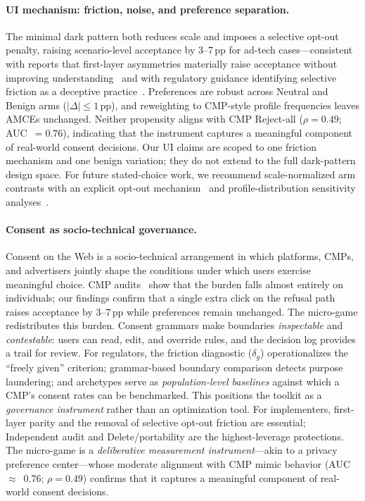 \documentclass{eusset}
\begin{document}
\paragraph{UI mechanism: friction, noise, and preference separation.}
The minimal dark pattern both reduces scale and imposes a selective opt-out penalty, raising scenario-level acceptance by 3--7\,pp for ad-tech cases---consistent with reports that first-layer asymmetries materially raise acceptance without improving understanding~\citep{Nouwens2020CHI,Habib2022CHI,Bielova2024USENIX,Berens2024CoSe} and with regulatory guidance identifying selective friction as a deceptive practice~\citep{EDPB2023DarkPatterns,ICO_CMA_2023_HarmfulDesign}. Preferences are robust across Neutral and Benign arms ($|\Delta| \le 1$\,pp), and reweighting to CMP-style profile frequencies leaves AMCEs unchanged. Neither propensity aligns with CMP Reject-all ($\rho = 0.49$; AUC~$= 0.76$), indicating that the instrument captures a meaningful component of real-world consent decisions. Our UI claims are scoped to one friction mechanism and one benign variation; they do not extend to the full dark-pattern design space. For future stated-choice work, we recommend scale-normalized arm contrasts with an explicit opt-out mechanism~\citep{Swait1993SL,Fiebig2010GMNL} and profile-distribution sensitivity analyses~\citep{de2022improving}.

\paragraph{Consent as socio-technical governance.}
Consent on the Web is a socio-technical arrangement in which platforms, CMPs, and advertisers jointly shape the conditions under which users exercise meaningful choice. CMP audits~\citep{Nouwens2020CHI,Matte2020DoCookieBannersRespect,Bielova2024USENIX} show that the burden falls almost entirely on individuals; our findings confirm that a single extra click on the refusal path raises acceptance by 3--7\,pp while preferences remain unchanged. The micro-game redistributes this burden. Consent grammars make boundaries \emph{inspectable} and \emph{contestable}: users can read, edit, and override rules, and the decision log provides a trail for review. For regulators, the friction diagnostic ($\delta_g$) operationalizes the ``freely given'' criterion; grammar-based boundary comparison detects purpose laundering; and archetypes serve as \emph{population-level baselines} against which a CMP's consent rates can be benchmarked. This positions the toolkit as a \emph{governance instrument} rather than an optimization tool. For implementers, first-layer parity and the removal of selective opt-out friction are essential; Independent audit and Delete/portability are the highest-leverage protections. The micro-game is a \emph{deliberative measurement instrument}---akin to a privacy preference center---whose moderate alignment with CMP mimic behavior (AUC~$\approx$~0.76; $\rho = 0.49$) confirms that it captures a meaningful component of real-world consent decisions.
\end{document}
